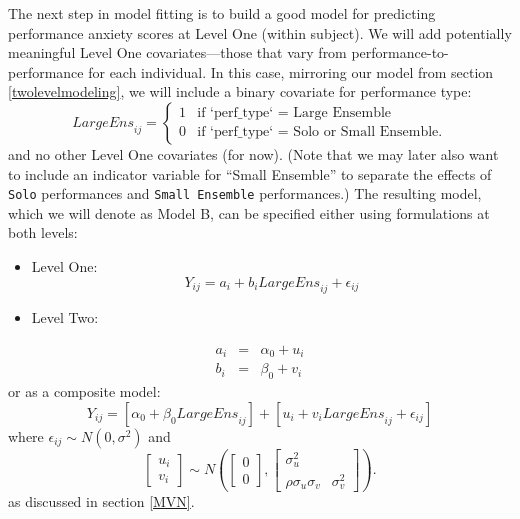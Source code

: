 \documentclass[
]{krantz}
\providecommand{\tightlist}{%
  \setlength{\itemsep}{0pt}\setlength{\parskip}{0pt}}
\begin{document}
The next step in model fitting is to build a good model for predicting performance anxiety scores at Level One (within subject). We will add potentially meaningful Level One covariates---those that vary from performance-to-performance for each individual. In this case, mirroring our model from section \ref{twolevelmodeling}, we will include a binary covariate for performance type:
\[ \textstyle{LargeEns}_{ij} = \left\{ \begin{array}{ll}
                                1 & \textrm{if `perf_type` = Large Ensemble} \\
                                0 & \textrm{if `perf_type` = Solo or Small Ensemble.}
                                        \end{array}
                                \right.  \]
and no other Level One covariates (for now). (Note that we may later also want to include an indicator variable for ``Small Ensemble'' to separate the effects of \texttt{Solo} performances and \texttt{Small\ Ensemble} performances.) The resulting model, which we will denote as Model B, can be specified either using formulations at both levels:

\begin{itemize}
\tightlist
\item
  Level One:
  \begin{equation}
  Y_{ij} = a_{i}+b_{i}\textstyle{LargeEns}_{ij}+\epsilon_{ij}
  \label{eq:level1modelb}
  \end{equation}
\item
  Level Two:
\end{itemize}

\begin{eqnarray*}
a_{i} & = & \alpha_{0}+u_{i} \\
b_{i} & = & \beta_{0}+v_{i}
\end{eqnarray*}
or as a composite model:
\begin{equation}
Y_{ij}=[\alpha_{0}+\beta_{0}\textstyle{LargeEns}_{ij}]+[u_{i}+v_{i}\textstyle{LargeEns}_{ij}+\epsilon_{ij}]
\label{eq:compmodelb}
\end{equation}
where \(\epsilon_{ij}\sim N(0,\sigma^2)\) and
\[ \left[ \begin{array}{c}
            u_{i} \\ v_{i}
          \end{array}  \right] \sim N \left( \left[
          \begin{array}{c}
            0 \\ 0
          \end{array} \right], \left[
          \begin{array}{cc}
            \sigma_{u}^{2} & \\
            \rho\sigma_{u}\sigma_{v} & \sigma_{v}^{2}
          \end{array} \right] \right). \]
as discussed in section \ref{MVN}.
\end{document}
